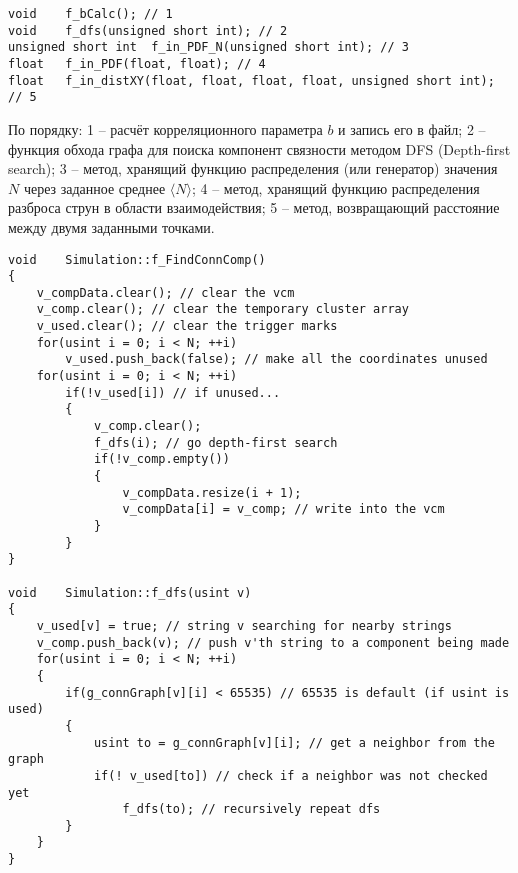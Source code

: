 \begin{lstlisting}
void	f_bCalc(); // 1
void	f_dfs(unsigned short int); // 2	
unsigned short int	f_in_PDF_N(unsigned short int); // 3
float	f_in_PDF(float, float); // 4	
float	f_in_distXY(float, float, float, float, unsigned short int); // 5
\end{lstlisting}
По порядку: 1 -- расчёт корреляционного параметра $b$ и запись его в файл; 2 -- функция обхода графа для поиска компонент связности методом DFS (Depth-first search); 3 -- метод, хранящий функцию распределения (или генератор) значения $N$ через заданное среднее $\langle N \rangle$; 4 -- метод, хранящий функцию распределения разброса струн в области взаимодействия; 5 -- метод, возвращающий расстояние между двумя заданными точками.
\begin{lstlisting}
void	Simulation::f_FindConnComp()
{
    v_compData.clear(); // clear the vcm
    v_comp.clear(); // clear the temporary cluster array
    v_used.clear(); // clear the trigger marks
    for(usint i = 0; i < N; ++i)
		v_used.push_back(false); // make all the coordinates unused
	for(usint i = 0; i < N; ++i)
		if(!v_used[i]) // if unused...
        {
            v_comp.clear();
			f_dfs(i); // go depth-first search
			if(!v_comp.empty())
            {
                v_compData.resize(i + 1);
                v_compData[i] = v_comp; // write into the vcm
            }
		}
}

void	Simulation::f_dfs(usint v)
{
    v_used[v] = true; // string v searching for nearby strings
	v_comp.push_back(v); // push v'th string to a component being made
	for(usint i = 0; i < N; ++i)
	{
	    if(g_connGraph[v][i] < 65535) // 65535 is default (if usint is used)
        {
            usint to = g_connGraph[v][i]; // get a neighbor from the graph
            if(! v_used[to]) // check if a neighbor was not checked yet
                f_dfs(to); // recursively repeat dfs
        }
	}
}
\end{lstlisting}
